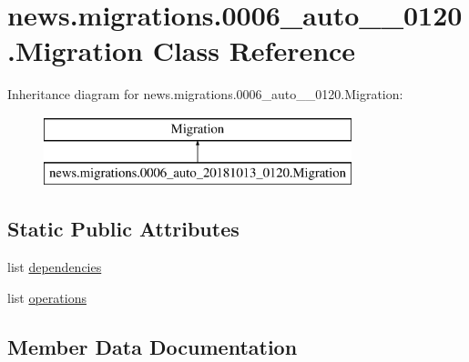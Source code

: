 \hypertarget{classnews_1_1migrations_1_10006__auto__20181013__0120_1_1_migration}{}\section{news.\+migrations.0006\+\_\+auto\+\_\+\_\+0120.Migration Class Reference}
\label{classnews_1_1migrations_1_10006__auto__20181013__0120_1_1_migration}
Inheritance diagram for news.\+migrations.0006\+\_\+auto\+\_\+\_\+0120.Migration\+:\begin{figure}[H]
\begin{center}
\leavevmode
\includegraphics[height=2.000000cm]{classnews_1_1migrations_1_10006__auto__20181013__0120_1_1_migration}
\end{center}
\end{figure}
\subsection*{Static Public Attributes}
\begin{DoxyCompactItemize}
\item 
list \mbox{\hyperlink{classnews_1_1migrations_1_10006__auto__20181013__0120_1_1_migration_acfbb0610f371eec6715c603d63c5a0ac}{dependencies}}
\item 
list \mbox{\hyperlink{classnews_1_1migrations_1_10006__auto__20181013__0120_1_1_migration_a6c786bba5496eef9adf188f58419b94e}{operations}}
\end{DoxyCompactItemize}


\subsection{Member Data Documentation}
\mbox{\label{classnews_1_1migrations_1_10006__auto__20181013__0120_1_1_migration_acfbb0610f371eec6715c603d63c5a0ac}} 
